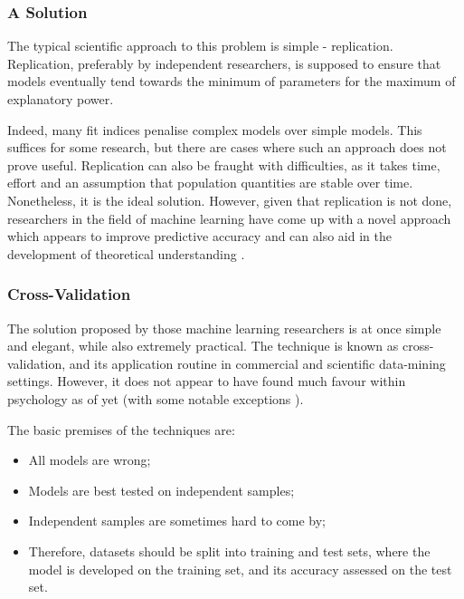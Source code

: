 
\subsubsection{A Solution}

The typical scientific approach to this problem is simple - replication. Replication, preferably by independent researchers, is supposed to ensure that models eventually tend towards the minimum of parameters for the maximum of explanatory power.

Indeed, many fit indices penalise complex models over simple models. This suffices for some research, but there are cases where such an approach does not prove useful. Replication can also be fraught with difficulties, as it takes time, effort and an assumption that population quantities are stable over time. Nonetheless, it is the ideal solution. However, given that replication is not done, researchers in the field of machine learning have come up with a novel approach which appears to improve predictive accuracy and can also aid in the development of theoretical understanding \cite{friedman2009elements}.

\subsubsection{Cross-Validation}

The solution proposed by those machine learning researchers is at once simple and elegant, while also extremely practical. The technique is known as cross-validation, and its application routine in commercial and scientific data-mining settings. However, it does not appear to have found much favour within psychology as of yet (with some notable exceptions \cite{dawes1979robust}).

The basic premises of the techniques are:
\begin{itemize}
\item All models are wrong;
\item Models are best tested on independent samples;
\item Independent samples are sometimes hard to come by;
\item Therefore, datasets should be split into training and test sets, where the model is developed on the training set, and its accuracy assessed on the test set.
\end{itemize}

